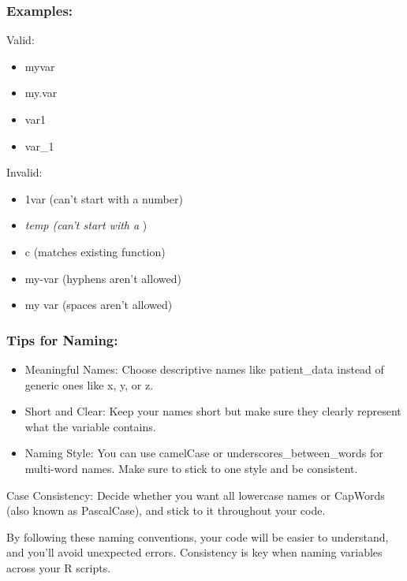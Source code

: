 \documentclass[
]{book}
\begin{document}
\hypertarget{examples}{%
\subsubsection{Examples:}\label{examples}}

Valid:

\begin{itemize}
\item
  myvar
\item
  my.var
\item
  var1
\item
  var\_1
\end{itemize}

Invalid:

\begin{itemize}
\item
  1var (can't start with a number)
\item
  \emph{temp (can't start with a })
\item
  c (matches existing function)
\item
  my-var (hyphens aren't allowed)
\item
  my var (spaces aren't allowed)
\end{itemize}

\hypertarget{tips-for-naming}{%
\subsubsection{Tips for Naming:}\label{tips-for-naming}}

\begin{itemize}
\item
  Meaningful Names: Choose descriptive names like patient\_data instead of generic ones like x, y, or z.
\item
  Short and Clear: Keep your names short but make sure they clearly represent what the variable contains.
\item
  Naming Style: You can use camelCase or underscores\_between\_words for multi-word names. Make sure to stick to one style and be consistent.
\end{itemize}

Case Consistency: Decide whether you want all lowercase names or CapWords (also known as PascalCase), and stick to it throughout your code.

By following these naming conventions, your code will be easier to understand, and you'll avoid unexpected errors. Consistency is key when naming variables across your R scripts.
\end{document}
